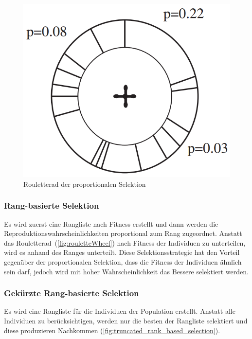         \begin{figure}[H]
          \includegraphics[scale=0.4,center]{graphics/roulettewheel}
          \caption[\protect{}, S.24]{Rouletterad der proportionalen Selektion\label{fig:rouletteWheel}}
        \end{figure}

      \subsubsection{Rang-basierte Selektion}

        Es wird zuerst eine Rangliste nach Fitness erstellt und dann werden die Reproduktionswahrscheinlichkeiten proportional zum Rang zugeordnet.
        Anstatt das Rouletterad~(\vref{fig:rouletteWheel}) nach Fitness der Individuen zu unterteilen,
        wird es anhand des Ranges unterteilt.
        Diese Selektionsstrategie hat den Vorteil gegenüber der proportionalen Selektion,
        dass die Fitness der Individuen ähnlich sein darf,
        jedoch wird mit hoher Wahrscheinlichkeit das Bessere selektiert werden.

      \subsubsection{Gekürzte Rang-basierte Selektion}

        Es wird eine Rangliste für die Individuen der Population erstellt.
        Anstatt alle Individuen zu berücksichtigen, werden nur die besten der Rangliste selektiert und diese produzieren Nachkommen (\vref{fig:truncated_rank_based_selection}).

